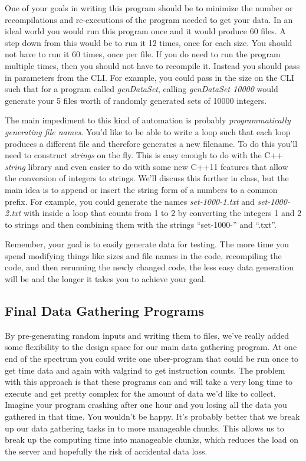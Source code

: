 \documentclass[]{tufte-handout}
\begin{document}
One of your goals in writing this program should be to minimize the number or recompilations and re-executions of the program needed to get your data. In an ideal world you would run this program once and it would produce 60 files. A step down from this would be to run it 12 times, once for each size. You should not have to run it 60 times, once per file. If you do need to run the program multiple times, then you should not have to recompile it.  Instead you should pass in parameters from the CLI. For example, you could pass in the size on the CLI such that for a program called \textit{genDataSet}, calling \textit{genDataSet 10000} would generate your 5 files worth of randomly generated sets of 10000 integers.  

The main impediment to this kind of automation is probably \textit{programmatically generating file names}.  You'd like to be able to write a loop such that each loop produces a different file and therefore generates a new filename. To do this you'll need to construct \textit{strings} on the fly. This is easy enough to do with the C++ \textit{string} library and even easier to do with some new C++11 features that allow the conversion of integers to strings. We'll discuss this further in class, but the main idea is to  append or insert the string form of a numbers to a common prefix. For example, you could generate the names \textit{set-1000-1.txt} and \textit{set-1000-2.txt} with inside a loop that counts from 1 to 2 by converting the integers 1 and 2 to strings and then combining them with the strings ``set-1000-'' and ``.txt''.  

Remember, your goal is to easily generate data for testing.  The more time you spend modifying things like sizes and file names in the code, recompiling the code, and then rerunning the newly changed code, the less easy data generation will be and the longer it takes you to achieve your goal. 

\subsection{Final Data Gathering Programs}

By pre-generating random inputs and writing them to files, we've really added some flexibility to the design space for our main data gathering program. At one end of the spectrum you could write one uber-program that could be run once to get time data and again with valgrind to get instruction counts. The problem with this approach is that these programs can and will take a very long time to execute and get pretty complex for the amount of data we'd like to collect. Imagine your program crashing after one hour and you losing all the data you gathered in that time.  You wouldn't be happy.  It's probably better that we break up our data gathering tasks in to more manageable chunks. This allows us to break up the computing time into manageable chunks, which reduces the load on the server and hopefully the risk of accidental data loss.
\end{document}
